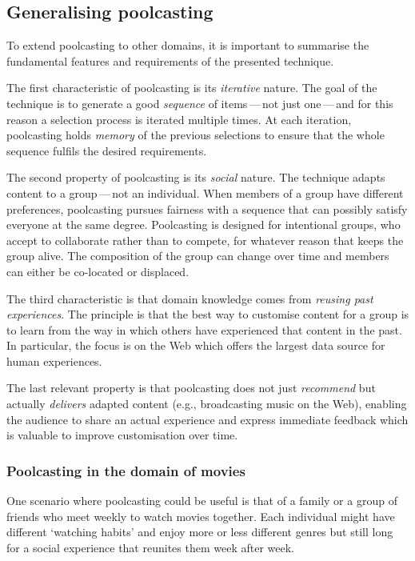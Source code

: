 \subsection{Generalising poolcasting} %
\label{sec:generalisation}

To extend poolcasting to other domains, it is important to summarise the fundamental features and requirements of the presented technique.

The first characteristic of poolcasting is its \emph{iterative} nature.
The goal of the technique is to generate a good \emph{sequence} of items\,---\,not just one\,---\,and for this reason a selection process is iterated multiple times.
At each iteration, poolcasting holds \emph{memory} of the previous selections to ensure that the whole sequence fulfils the desired requirements.

The second property of poolcasting is its \emph{social} nature.
The technique adapts content to a group\,---\,not an individual.
When members of a group have different preferences, poolcasting pursues fairness with a sequence that can possibly satisfy everyone at the same degree.
Poolcasting is designed for intentional groups, who accept to collaborate rather than to compete, for whatever reason that keeps the group alive.
The composition of the group can change over time and members can either be co-located or displaced.

The third characteristic is that domain knowledge comes from \emph{reusing past experiences}. %
The principle is that the best way to customise content for a group is to learn from the way in which others have experienced that content in the past.
In particular, the focus is on the Web which offers the largest data source for human experiences.

The last relevant property is that poolcasting does not just \emph{recommend} but actually \emph{delivers} adapted content (e.g., broadcasting music on the Web), enabling the audience to share an actual experience and express immediate feedback which is valuable to improve customisation over time. 

\subsubsection{Poolcasting in the domain of movies} %
\label{sub:poolcasting_in_the_domain_of_movies}

One scenario where poolcasting could be useful is that of a family or a group of friends who meet weekly to watch movies together.
Each individual might have different `watching habits' and enjoy more or less different genres but still long for a social experience that reunites them week after week. %

